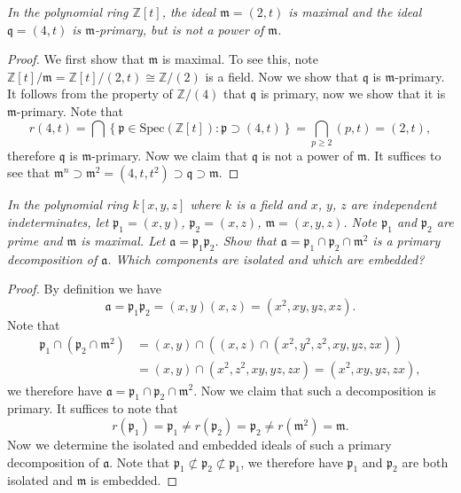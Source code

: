 \begin{problem}\em
In the polynomial ring $\mathbb{Z}[t]$, the ideal $\mathfrak{m}=(2,t)$ is maximal and the ideal $\mathfrak{q}=(4,t)$ is $\mathfrak{m}$-primary, but is not a power of $\mathfrak{m}$.
\end{problem}
\begin{proof}
We first show that $\mathfrak{m}$ is maximal. To see this, note $\mathbb{Z}[t]/\mathfrak{m}=\mathbb{Z}[t]/(2,t)\cong\mathbb{Z}/(2)$ is a field. Now we show that $\mathfrak{q}$ is $\mathfrak{m}$-primary. It follows from the property of $\mathbb{Z}/(4)$ that $\mathfrak{q}$ is primary, now we show that it is $\mathfrak{m}$-primary. Note that 
$$
r\left( 4,t \right) =\bigcap{\left\{ \mathfrak{p} \in \mathrm{Spec}\left( \mathbb{Z} \left[ t \right] \right) :\mathfrak{p} \supset \left( 4,t \right) \right\}}=\bigcap_{p\ge 2}{\left( p,t \right)}=\left( 2,t \right) ,
$$
therefore $\mathfrak{q}$ is $\mathfrak{m}$-primary. Now we claim that $\mathfrak{q}$ is not a power of $\mathfrak{m}$. It suffices to see that $\mathfrak{m} ^n\supset \mathfrak{m} ^2=\left( 4,t,t^2 \right) \supset \mathfrak{q} \supset \mathfrak{m} $.
\end{proof}
\begin{problem}\em
In the polynomial ring $k[x,y,z]$ where $k$ is a field and $x$, $y$, $z$ are independent indeterminates, let $\mathfrak{p}_1=(x,y)$, $\mathfrak{p}_2=(x,z)$, $\mathfrak{m}=(x,y,z)$. Note $\mathfrak{p}_1$ and $\mathfrak{p}_2$ are prime and $\mathfrak{m}$ is maximal. Let $\mathfrak{a}=\mathfrak{p}_1\mathfrak{p}_2$. Show that $\mathfrak{a}=\mathfrak{p}_1\cap\mathfrak{p}_2\cap\mathfrak{m}^2$ is a primary decomposition of $\mathfrak{a}$. Which components are isolated and which are embedded?
\end{problem}
\begin{proof}
By definition we have 
$$
\mathfrak{a} =\mathfrak{p} _1\mathfrak{p} _2=\left( x,y \right) \left( x,z \right) =\left( x^2,xy,yz,xz \right) .
$$
Note that 
$$
\begin{aligned}
\mathfrak{p} _1\cap \left( \mathfrak{p} _2\cap \mathfrak{m} ^2 \right) &=\left( x,y \right) \cap \left( \left( x,z \right) \cap \left( x^2,y^2,z^2,xy,yz,zx \right) \right) 
\\
&=\left( x,y \right) \cap \left( x^2,z^2,xy,yz,zx \right) =\left( x^2,xy,yz,zx \right) ,
\end{aligned}
$$
we therefore have $\mathfrak{a}=\mathfrak{p}_1\cap\mathfrak{p}_2\cap\mathfrak{m}^2$. Now we claim that such a decomposition is primary. It suffices to note that 
$$
r\left( \mathfrak{p} _1 \right) =\mathfrak{p} _1\ne r\left( \mathfrak{p} _2 \right) =\mathfrak{p} _2\ne r\left( \mathfrak{m} ^2 \right) =\mathfrak{m} .
$$
Now we determine the isolated and embedded ideals of such a primary decomposition of $\mathfrak{a}$. Note that $\mathfrak{p} _1\not\subset \mathfrak{p} _2\not\subset \mathfrak{p} _1$, we therefore have $\mathfrak{p}_1$ and $\mathfrak{p}_2$ are both isolated and $\mathfrak{m}$ is embedded.
\end{proof}
